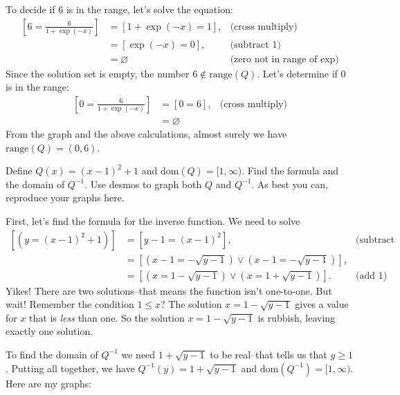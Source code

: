 \documentclass[12pt,fleqn,answers]{exam}
\newcommand{\dom}{\mbox{dom}}
\newcommand{\range}{\mbox{range}}
\begin{document}
\begin{questions}
\begin{solution}[3.5in]
\quad To decide if $6$ is in the range, let's solve the equation:
\begin{align*}
    \left[ 6 = \frac{6}{1+\exp(-x)} \right] &= \left[1+\exp(-x) = 1 \right], 
                                            &\mbox{(cross multiply)}\\
                                            &= \left[\exp(-x) = 0 \right], 
                                            &\mbox{(subtract 1)}\\
                                            &= \varnothing  &\mbox{(zero not in range of $\exp$)}
\end{align*}
Since the solution set is empty, the number $6 \notin \range(Q)$.  Let's determine
if $0$ is in the range:
\begin{align*}
    \left[ 0 = \frac{6}{1+\exp(-x)} \right] &= \left[ 0 = 6 \right], 
                                            &\mbox{(cross multiply)}\\
                                            &= \varnothing  
\end{align*}
From the graph and the above calculations, almost surely we have \mbox{$\range(Q) = (0,6).$} 

\end{solution}

\newpage

\question[5] Define $Q(x) = (x-1)^2 + 1$ and $\dom(Q) = [1,\infty)$. Find the formula
and the domain of $Q^{-1}$. Use desmos to graph both $Q$ and $Q^{-1}$. As best you can,
reproduce your graphs here.
\begin{solution} First, let's find the formula for the  inverse function. We need to solve
\begin{align*}
 \left[ \left(y = (x-1)^2 + 1 \right) \right] &=  \left[ y -  1 = (x-1)^2\right],   & \mbox{(subtract 1)} \\
         &= \left[ \left(x-1 = -\sqrt{y -  1} \right) \lor  \left(x-1 = -\sqrt{y -  1} \right) \right],  \\
         &= \left[ \left(x = 1 -\sqrt{y -  1} \right) \lor  \left(x = 1 +\sqrt{y -  1} \right)\right]. & \mbox{(add 1)}
\end{align*}
Yikes! There are two solutions--that means the function isn't one-to-one. But wait! Remember the condition
\(1 \leq x\)?  The solution \(x = 1 -\sqrt{y -  1}\) gives a value for $x$ that is \emph{less} than one. So the
solution \(x = 1 -\sqrt{y -  1}\) is rubbish, leaving exactly one solution. 

\quad To find the domain of $Q^{-1}$ we need $1 + \sqrt{y -  1}$ to be real--that tells us that \mbox{$y \geq 1$}.  
Putting all together, we have $Q^{-1}(y) =  1 +  \sqrt{y -  1}$ and $\dom(Q^{-1}) = [1,\infty)$.
Here are my graphs:


\end{solution}
\end{questions}
\end{document}
